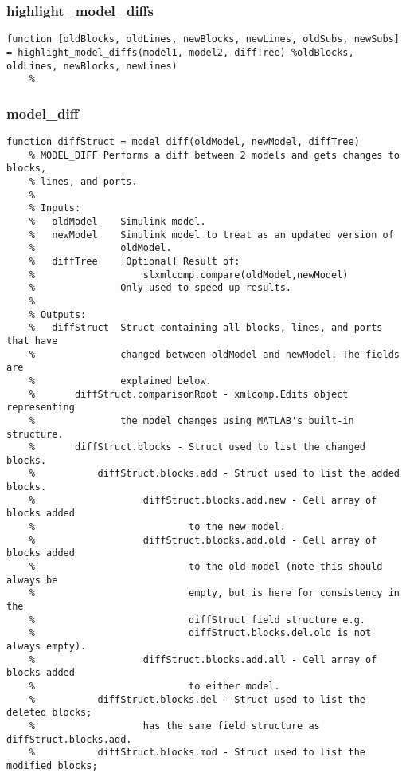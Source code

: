 \documentclass[12pt,letterpaper]{report}
\begin{document}
		\subsubsection{highlight\_model\_diffs}
\begin{lstlisting}
function [oldBlocks, oldLines, newBlocks, newLines, oldSubs, newSubs] = highlight_model_diffs(model1, model2, diffTree) %oldBlocks, oldLines, newBlocks, newLines)
    %
\end{lstlisting}
		\subsubsection{model\_diff}
\begin{lstlisting}
function diffStruct = model_diff(oldModel, newModel, diffTree)
    % MODEL_DIFF Performs a diff between 2 models and gets changes to blocks,
    % lines, and ports.
    %
    % Inputs:
    %   oldModel    Simulink model.
    %   newModel    Simulink model to treat as an updated version of
    %               oldModel.
    %   diffTree    [Optional] Result of:
    %                   slxmlcomp.compare(oldModel,newModel)
    %               Only used to speed up results.
    %
    % Outputs:
    % 	diffStruct  Struct containing all blocks, lines, and ports that have
    %               changed between oldModel and newModel. The fields are
    %               explained below.
    %       diffStruct.comparisonRoot - xmlcomp.Edits object representing
    %               the model changes using MATLAB's built-in structure.
    %       diffStruct.blocks - Struct used to list the changed blocks.
    %           diffStruct.blocks.add - Struct used to list the added blocks.
    %                   diffStruct.blocks.add.new - Cell array of blocks added
    %                           to the new model.
    %                   diffStruct.blocks.add.old - Cell array of blocks added
    %                           to the old model (note this should always be
    %                           empty, but is here for consistency in the
    %                           diffStruct field structure e.g.
    %                           diffStruct.blocks.del.old is not always empty).
    %                   diffStruct.blocks.add.all - Cell array of blocks added
    %                           to either model.
    %           diffStruct.blocks.del - Struct used to list the deleted blocks;
    %                   has the same field structure as diffStruct.blocks.add.
    %           diffStruct.blocks.mod - Struct used to list the modified blocks;

\end{lstlisting}
\end{document}
